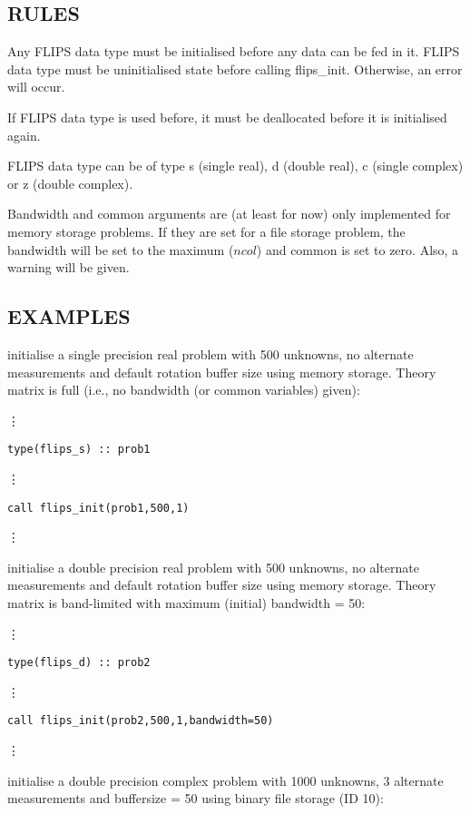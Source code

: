 \documentclass[a4paper,twoside]{refrep}
\newcommand{\code}[1]{{\tt #1}}
\begin{document}
\subsection*{RULES}

Any FLIPS data type must be initialised before any data can be fed in it. FLIPS data type must be uninitialised state before calling flips\_init. Otherwise, an error will occur. 

If FLIPS data type is used before, it must be deallocated  before it is initialised again.

FLIPS data type can be of type s (single real), d (double real), c (single complex) or z (double complex).

Bandwidth and common arguments are (at least for now) only implemented for memory storage problems. If they are set for a file storage problem, the bandwidth will be set to the maximum ($ncol$) and common is set to zero. Also, a warning will be given.

\subsection*{EXAMPLES}


initialise a single precision real problem with 500 unknowns, no alternate measurements and default rotation buffer size using memory storage. Theory matrix is full (i.e., no bandwidth (or common variables) given):

\vdots

\code{type(flips\_s) :: prob1}

\vdots

\code{call flips\_init(prob1,500,1)}

\vdots

initialise a double precision real problem with 500 unknowns, no alternate measurements and default rotation buffer size using memory storage. Theory matrix is band-limited with maximum (initial) bandwidth = 50:

\vdots

\code{type(flips\_d) :: prob2}

\vdots

\code{call flips\_init(prob2,500,1,bandwidth=50)}

\vdots


{}
initialise a double precision complex problem with 1000 unknowns, 3 alternate measurements and buffersize = 50 using binary file storage (ID 10):
\end{document}

